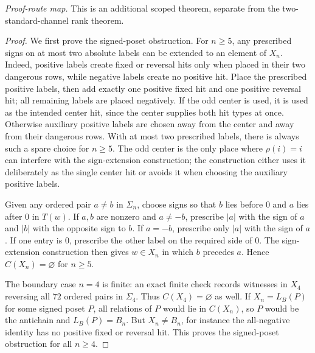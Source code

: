\noindent\textit{Proof-route map.}  This is an additional scoped theorem, separate from the two-standard-channel rank theorem.
\begin{proof}
We first prove the signed-poset obstruction.  For $n\ge5$, any prescribed signs on at most two absolute labels can be
extended to an element of $X_n$.  Indeed, positive labels create fixed or reversal hits only when placed in their two
dangerous rows, while negative labels create no positive hit.  Place the prescribed positive labels, then add exactly
one positive fixed hit and one positive reversal hit; all remaining labels are placed negatively.  If the odd center is
used, it is used as the intended center hit, since the center supplies both hit types at once.  Otherwise auxiliary
positive labels are chosen away from the center and away from their dangerous rows.  With at most two prescribed labels,
there is always such a spare choice for $n\ge5$.  The odd center is the only place where $\rho(i)=i$ can interfere with the sign-extension construction; the construction either uses it deliberately as the single center hit or avoids it when choosing the auxiliary positive labels.

Given any ordered pair $a\ne b$ in $\Sigma_n$, choose signs so that $b$ lies before $0$ and $a$ lies after $0$ in
$T(w)$.  If $a,b$ are nonzero and $a\ne-b$, prescribe $|a|$ with the sign of $a$ and $|b|$ with the opposite sign to
$b$.  If $a=-b$, prescribe only $|a|$ with the sign of $a$.  If one entry is $0$, prescribe the other label on the
required side of $0$.  The sign-extension construction then gives $w\in X_n$ in which $b$ precedes $a$.  Hence
$C(X_n)=\varnothing$ for $n\ge5$.

The boundary case $n=4$ is finite: an exact finite check records witnesses in $X_4$ reversing all $72$ ordered pairs
in $\Sigma_4$.  Thus $C(X_4)=\varnothing$ as well.  If $X_n=L_B(P)$ for some signed poset $P$, all relations of $P$
would lie in $C(X_n)$, so $P$ would be the antichain and $L_B(P)=B_n$.  But $X_n\ne B_n$, for instance the all-negative
identity has no positive fixed or reversal hit.  This proves the signed-poset obstruction for all $n\ge4$.


\end{proof}

